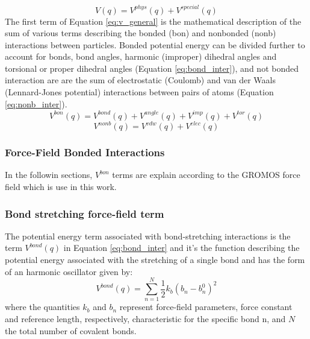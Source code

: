 \begin{equation}
    V(q)=V^{phys}(q) + V^{special}(q)
    \label{eq:v_general}
\end{equation}
The first term of Equation \ref{eq:v_general} is the mathematical description of the sum of various terms describing the bonded (bon) and nonbonded (nonb) interactions between particles. Bonded potential energy can be divided further to account for bonds, bond angles, harmonic (improper) dihedral angles and torsional or proper dihedral angles (Equation \ref{eq:bond_inter}), and not bonded interaction are are the sum of electrostatic (Coulomb) and van der Waals (Lennard-Jones potential) interactions between pairs of atoms (Equation \ref{eq:nonb_inter}).
\begin{equation}
    V^{bon}(q)= V^{bond}(q)+ V^{angle}(q)+ V^{imp}(q)+ V^{tor}(q)
    \label{eq:bond_inter}
\end{equation}
\begin{equation}
     V^{nonb}(q)=  V^{vdw}(q)+ V^{elec}(q)
     \label{eq:nonb_inter}
\end{equation}

\subsubsection{Force-Field Bonded Interactions}

In the followin sections, $V^{bon}$ terms are explain according to the GROMOS force field which is use in this work.

\subsubsection*{Bond stretching force-field term}
The potential energy term associated with bond-stretching interactions is the term $V^{bond}(q)$ in Equation \ref{eq:bond_inter} and it's the function describing the potential energy associated with the stretching of a single bond and has the form of an harmonic oscillator given by:
\begin{equation}
    V^{bond}(q) = \sum_{n=1}^{N}\frac{1}{2}k_{b}{(b_{n}-b_{n}^{0})}^2
    \label{eq:pot_bond}
\end{equation}
where the quantities $k_{b}$ and $b_{n}$ represent force-field parameters, force constant and reference length, respectively, characteristic for the specific bond n, and $N$ the total number of covalent bonds. 


